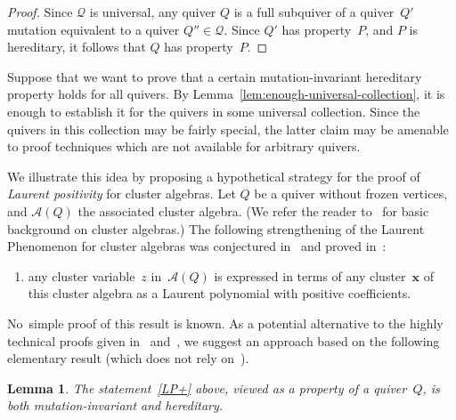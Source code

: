 \documentclass[10pt]{amsart}
\newtheorem{lemma}[theorem]{Lemma}
\theoremstyle{definition}
\begin{document}
\begin{proof}
Since $\mathcal{Q}$ is universal, 
any quiver $Q$ is a full subquiver of a quiver~$Q'$ 
mutation equivalent to a quiver $Q''\in\mathcal{Q}$. 
Since $Q'$ has property~$P$, and $P$ is hereditary, it follows that $Q$ has property~$P$. 
\end{proof}
 
Suppose that we want to prove that a certain mutation-invariant hereditary property holds for all quivers. By Lemma~\ref{lem:enough-universal-collection}, it is enough to establish it for the quivers in some universal collection. 
Since the quivers in this collection may be fairly special, the latter claim may be amenable to proof techniques which are not available for arbitrary quivers. 


We illustrate this idea by proposing a hypothetical strategy for the proof of \emph{Laurent positivity} for cluster algebras. 
Let $Q$ be a quiver without frozen vertices, and $\mathcal{A}(Q)$ the associated cluster algebra. (We refer the reader to~\cite{FWZ} for basic background on cluster algebras.) 
The following strengthening of the Laurent Phenomenon for cluster algebras 
was conjectured in~\cite{ca1} and proved in~\cite{GHKK,lee-schiffler}: 
\begin{enumerate}[label=(LP+)]
\item\label{LP+} %
any cluster variable~$z$ in~$\mathcal{A}(Q)$ is expressed in terms of any cluster~$\mathbf{x}$ of this cluster algebra as a Laurent polynomial with positive coefficients. 
\end{enumerate}
No~simple proof of this result is known. As a potential alternative to the highly technical proofs given in~\cite{GHKK} and~\cite{lee-schiffler}, we suggest an approach based on the following elementary result (which does not rely on~\cite{GHKK,lee-schiffler}). 

\begin{lemma}
\label{lem:laurent-positivity-is-hereditary}
The statement~\ref{LP+} above, viewed as a property of a quiver~$Q$, is both mutation-invariant and hereditary. 
\end{lemma}
\end{document}
